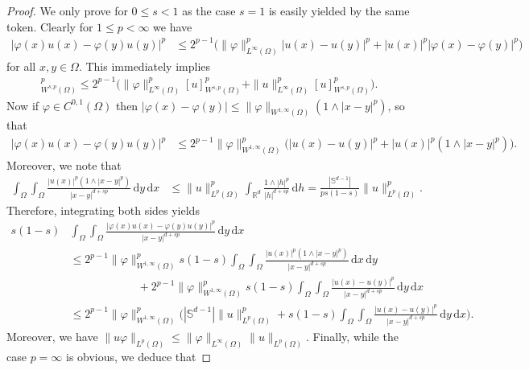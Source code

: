 \documentclass[12pt, reqno]{amsart}%
\theoremstyle{plain}  %
\theoremstyle{definition}  %
\theoremstyle{remark}
\numberwithin{equation}{section}
\DeclareMathOperator{\R}{\mathbb{R}}
\renewcommand{\d}{\,\mathrm{d}}
\begin{document}
\begin{proof}
We only prove for $0\leq s <1$  as the case $s=1$ is easily yielded by the same token. Clearly   for $1\leq p< \infty$  we  have
\begin{align*}
|\varphi(x)u(x)-\varphi(y)u(y)|^p
&\leq 2^{p-1}\Big( \|\varphi\|^p_{L^\infty(\Omega)}|u(x)-u(y)|^p+ |u(x)|^p|\varphi(x)-\varphi(y)|^p \Big)
\end{align*}
for all $x,y\in \Omega$. This immediately implies
\begin{align*}
[u\varphi ]^p_{W^{s,p}(\Omega)}
\leq
2^{p-1}\big(\|\varphi\|^p_{L^\infty(\Omega)} [u]^p_{W^{s,p}(\Omega)}
+ \|u\|^p_{L^\infty(\Omega)}  [u]^p_{W^{s,p}(\Omega)}\big).
\end{align*}
Now if  $\varphi\in C^{0,1}(\Omega)$ then  $ |\varphi(x)-\varphi(y)|\leq \|\varphi\|_{W^{1,\infty}(\Omega)}(1\land |x-y|^p)$, so that
\begin{align*}
|\varphi(x)u(x)-\varphi(y)u(y)|^p
&\leq 2^{p-1} \|\varphi\|^p_{W^{1,\infty}(\Omega)}
\Big( |u(x)-u(y)|^p+ |u(x)|^p(1\land |x-y|^p)\Big).
\end{align*}
Moreover, we note that
\begin{align*}
 \int_{\Omega}\int_{\Omega} \frac{|u(x)|^p(1\land |x-y|^p)}{|x-y|^{d+sp}} \d y \d x
&\leq  \|u\|^p_{L^p(\Omega)} \int_{\R^d} \frac{1\land |h|^p}{|h|^{d+sp}}\d h =  \frac{|\mathbb{S}^{d-1}|}{ps(1-s)} \|u\|^p_{L^p(\Omega)}.
\end{align*}
Therefore, integrating both sides  yields
\begin{align*}
 s(1-s)&\int_{\Omega}\int_{\Omega} \frac{|\varphi(x)u(x)-\varphi(y)u(y)|^p}{|x-y|^{d+sp}} \d y \d x
\\
&\leq  2^{p-1} \|\varphi\|^p_{W^{1,\infty}(\Omega)}   s(1-s)\int_{\Omega}\int_{\Omega} \frac{|u(x)|^p(1\land |x-y|^p)}{|x-y|^{d+sp}} \d x\d y\\
& \qquad\qquad\qquad + 2^{p-1} \|\varphi\|^p_{W^{1,\infty}(\Omega)}  s(1-s)\int_{\Omega}\int_{\Omega} \frac{|u(x)-u(y)|^p}{|x-y|^{d+sp}} \d y \d x\\
& \leq  2^{p-1} \|\varphi\|^p_{W^{1,\infty}(\Omega)}
\bigg(  |\mathbb{S}^{d-1}|\|u\|^p_{L^p(\Omega)}+  s(1-s) \int_{\Omega}\int_{\Omega} \frac{|u(x)-u(y)|^p}{|x-y|^{d+sp}} \d y \d x\bigg).
\end{align*}
Moreover, we have  $\|u\varphi\|_{L^p(\Omega)}
\leq \|\varphi \|_{L^\infty(\Omega)}  \|u\|_{L^p(\Omega)}$. Finally, while the case $p=\infty$ is obvious, we deduce that

\end{proof}
\end{document}
